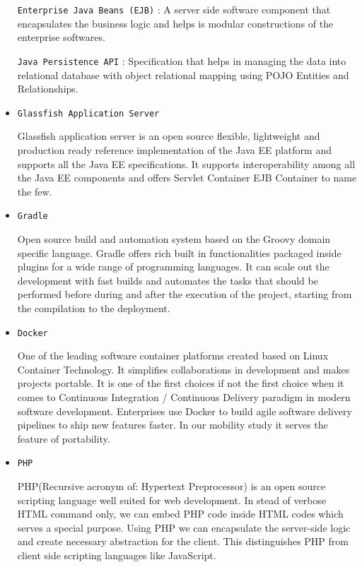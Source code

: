 \begin{itemize}
		\subitem{-} \texttt{Enterprise Java Beans (EJB)} : A server side software component that encapsulates the business logic and helps is modular constructions of the enterprise softwares.
		
		\subitem{-} \texttt{Java Persistence API} : Specification that helps in managing the data into relational database with object relational mapping using POJO Entities and Relationships.
		
	\item \texttt{Glassfish Application Server\cite{Glassfish}}
	\par Glassfish application server is an open source flexible, lightweight and production ready reference implementation of the Java EE platform and supports all the Java EE specifications. It supports interoperability among all the Java EE components and offers Servlet Container EJB Container to name the few.
	
	\item  \texttt{Gradle\cite{Gradle}}
	\par Open source build and automation system based on the Groovy domain specific language. Gradle offers rich built in functionalities packaged inside plugins for a wide range of programming languages. It can scale out the development with fast builds and automates the tasks that should be performed before during and after the execution of the project, starting from the compilation to the deployment.
	
	\item \texttt{Docker\cite{Docker}}
	\par One of the leading software container platforms created based on Linux Container Technology. It simplifies collaborations in development and makes projects portable. It is one of the first choices if not the first choice when it comes to Continuous Integration / Continuous Delivery paradigm in modern software development. Enterprises use Docker to build agile software delivery pipelines to ship new features faster. In our mobility study it serves the feature of portability. 
	
	\item \texttt{PHP\cite{PHP}}
	\par PHP(Recursive acronym of: Hypertext Preprocessor) is an open source scripting language well suited for web development. In stead of verbose HTML command only, we can embed PHP code inside HTML codes which serves a special purpose. Using PHP we can encapsulate the server-side logic and create necessary abstraction for the client. This distinguishes PHP from client side scripting languages like JavaScript. 
	

\end{itemize}
